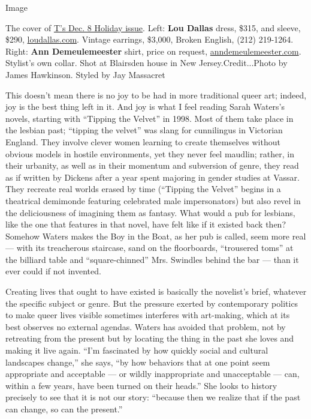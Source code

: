 Image

The cover of
\href{https://www.nytimes3xbfgragh.onion/issue/t-magazine/2019/11/21/ts-dec-8-holiday-issue}{T's
Dec. 8 Holiday issue}. Left: \textbf{Lou Dallas} dress, \$315, and
sleeve, \$290, \href{https://www.loudallas.com/}{loudallas.com}. Vintage
earrings, \$3,000, Broken English, (212) 219-1264. Right: \textbf{Ann
Demeulemeester} shirt, price on request,
\href{https://www.anndemeulemeester.com/}{anndemeulemeester.com}.
Stylist's own collar. Shot at Blairsden house in New
Jersey.Credit...Photo by James Hawkinson. Styled by Jay Massacret

This doesn't mean there is no joy to be had in more traditional queer
art; indeed, joy is the best thing left in it. And joy is what I feel
reading Sarah Waters's novels, starting with ``Tipping the Velvet'' in
1998. Most of them take place in the lesbian past; ``tipping the
velvet'' was slang for cunnilingus in Victorian England. They involve
clever women learning to create themselves without obvious models in
hostile environments, yet they never feel maudlin; rather, in their
urbanity, as well as in their momentum and subversion of genre, they
read as if written by Dickens after a year spent majoring in gender
studies at Vassar. They recreate real worlds erased by time (``Tipping
the Velvet'' begins in a theatrical demimonde featuring celebrated male
impersonators) but also revel in the deliciousness of imagining them as
fantasy. What would a pub for lesbians, like the one that features in
that novel, have felt like if it existed back then? Somehow Waters makes
the Boy in the Boat, as her pub is called, seem more real --- with its
treacherous staircase, sand on the floorboards, ``trousered toms'' at
the billiard table and ``square-chinned'' Mrs. Swindles behind the bar
--- than it ever could if not invented.

Creating lives that ought to have existed is basically the novelist's
brief, whatever the specific subject or genre. But the pressure exerted
by contemporary politics to make queer lives visible sometimes
interferes with art-making, which at its best observes no external
agendas. Waters has avoided that problem, not by retreating from the
present but by locating the thing in the past she loves and making it
live again. ``I'm fascinated by how quickly social and cultural
landscapes change,'' she says, ``by how behaviors that at one point seem
appropriate and acceptable --- or wildly inappropriate and unacceptable
--- can, within a few years, have been turned on their heads.'' She
looks to history precisely to see that it is not our story: ``because
then we realize that if the past can change, so can the present.''

